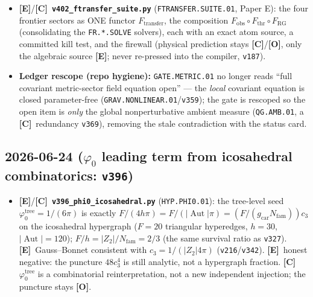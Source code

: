 \documentclass[11pt]{article}
\providecommand{\mE}{\textbf{[E]}}\providecommand{\mC}{\textbf{[C]}}
\providecommand{\mO}{\textbf{[O]}}\providecommand{\mX}{\textbf{[X]}}
\providecommand{\vref}[1]{\texttt{#1}}
\providecommand{\gcar}{g_{\mathrm{car}}}\providecommand{\Nfam}{N_{\mathrm{fam}}}
\providecommand{\Aut}{\operatorname{Aut}}
\begin{document}
\begin{itemize}
\item \mE/\mC\ \textbf{\texttt{v402\_ftransfer\_suite.py}} (\texttt{FTRANSFER.SUITE.01}, Paper E): the four frontier sectors as ONE functor $F_{\mathrm{transfer}}$, the composition $F_{\mathrm{obs}}\circ F_{\mathrm{thr}}\circ F_{\mathrm{RG}}$ (consolidating the \texttt{FR.*.SOLVE} solvers), each with an exact atom source, a committed kill test, and the firewall (physical prediction stays \mC/\mO, only the algebraic source \mE; never re-pressed into the compiler, \vref{v187}).
\item \textbf{Ledger rescope (repo hygiene):} \texttt{GATE.METRIC.01} no longer reads ``full covariant metric-sector field equation open'' --- the \emph{local} covariant equation is closed parameter-free (\texttt{GRAV.NONLINEAR.01}/\vref{v359}); the gate is rescoped so the open item is \emph{only} the global nonperturbative ambient measure (\texttt{QG.AMB.01}, a \mC\ redundancy \vref{v369}), removing the stale contradiction with the status card.
\end{itemize}

\subsection*{2026-06-24 ($\varphi_0$ leading term from icosahedral combinatorics: \texttt{v396})}
\begin{itemize}
  \item \mE/\mC\ \textbf{\texttt{v396\_phi0\_icosahedral.py}} (\texttt{HYP.PHI0.01}): the tree-level seed $\varphi_0^{\mathrm{tree}}=1/(6\pi)$ is exactly $F/(4h\pi)=F/(|\Aut|\pi)=(F/(\gcar\Nfam))c_3$ on the icosahedral hypergraph ($F=20$ triangular hyperedges, $h=30$, $|\Aut|=120$); $F/h=|Z_2|/\Nfam=2/3$ (the same survival ratio as \texttt{v327}). \mE\ Gauss--Bonnet consistent with $c_3=1/(|Z_2|4\pi)$ (\texttt{v216}/\texttt{v342}). \mE\ honest negative: the puncture $48c_3^4$ is still analytic, not a hypergraph fraction. \mC\ $\varphi_0^{\mathrm{tree}}$ is a combinatorial reinterpretation, not a new independent injection; the puncture stays \mO.
\end{itemize}
\end{document}
